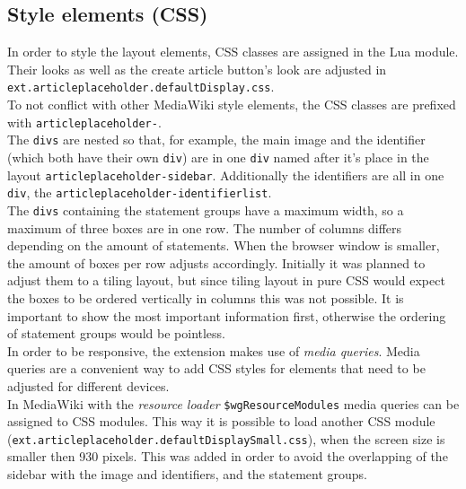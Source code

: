 \subsection{Style elements (CSS)}

In order to style the layout elements, CSS classes are assigned in the Lua module. Their looks as well as the create article button's look are adjusted in \texttt{ext.articleplaceholder.defaultDisplay.css}. \\
To not conflict with other MediaWiki style elements, the CSS classes are prefixed with \texttt{\justify articleplaceholder-}. \\
The \texttt{\justify divs} are nested so that, for example, the main image and the identifier (which both have their own \texttt{div}) are in one \texttt{div} named after it's place in the layout \texttt{\justify articleplaceholder-sidebar}. Additionally the identifiers are all in one \texttt{div}, the \texttt{\justify articleplaceholder-identifierlist}. \\
The \texttt{divs} containing the statement groups have a maximum width, so a maximum of three boxes are in one row. The number of columns differs depending on the amount of statements. When the browser window is smaller, the amount of boxes per row adjusts accordingly. Initially it was planned to adjust them to a tiling layout, but since tiling layout in pure CSS would expect the boxes to be ordered vertically in columns this was not possible.  It is important to show the most important information first, otherwise the ordering of statement groups would be pointless. \\
In order to be responsive, the extension makes use of \textit{media queries}. Media queries are a convenient way to add CSS styles for elements that need to be adjusted for different devices. \citep[43]{mediaquery}\\
In MediaWiki with the \textit{resource loader} \texttt{\justify \$wgResourceModules} media queries can be assigned to CSS modules. This way it is possible to load another CSS module (\texttt{\justify ext.articleplaceholder.defaultDisplaySmall.css}), when the screen size is smaller then 930 pixels. This was added in order to avoid the overlapping of the sidebar with the image and identifiers, and the statement groups.
